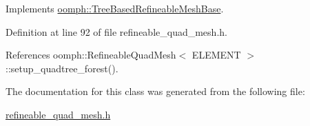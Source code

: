 Implements \hyperlink{classoomph_1_1TreeBasedRefineableMeshBase_aab7cbaa680b2258f2b1eea5de6bbe605}{oomph\+::\+Tree\+Based\+Refineable\+Mesh\+Base}.



Definition at line 92 of file refineable\+\_\+quad\+\_\+mesh.\+h.



References oomph\+::\+Refineable\+Quad\+Mesh$<$ E\+L\+E\+M\+E\+N\+T $>$\+::setup\+\_\+quadtree\+\_\+forest().



The documentation for this class was generated from the following file\+:\begin{DoxyCompactItemize}
\item 
\hyperlink{refineable__quad__mesh_8h}{refineable\+\_\+quad\+\_\+mesh.\+h}\end{DoxyCompactItemize}
